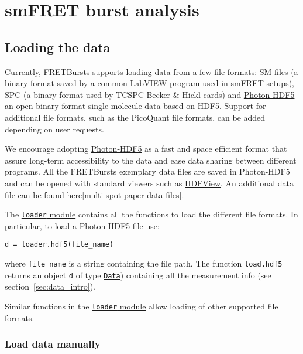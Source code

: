 \section{smFRET burst analysis}
\label{sec:analysis}

\subsection{Loading the data}
\label{sec:dataload}

Currently, FRETBursts supports loading data from a few file formats: SM files
(a binary format saved by a common LabVIEW program used in smFRET setups), 
SPC (a binary format used by TCSPC Becker \& Hickl cards) and 
\href{http://photon-hdf5.readthedocs.org/}{Photon-HDF5}  an open binary 
format single-molecule data based on HDF5. Support for additional file formats,
such as the PicoQuant file formats, can be added depending on user requests.

We encourage adopting \href{http://photon-hdf5.readthedocs.org/}{Photon-HDF5}
as a fast and space efficient format that assure long-term accessibility 
to the data and ease data sharing between different programs. All the 
FRETBursts exemplary data files are saved in Photon-HDF5 and can be opened with 
standard viewers such as 
\href{http://www.hdfgroup.org/products/java/hdfview/}{HDFView}. An additional data file 
can be found here[multi-spot paper data files].

The \href{http://fretbursts.readthedocs.org/en/latest/loader.html}{\texttt{loader} module}
contains all the functions to load the different file formats. 
In particular, to load a Photon-HDF5 file use:

\begin{verbatim}
d = loader.hdf5(file_name)
\end{verbatim}

where \verb|file_name| is a string containing the file path. The function
\verb|load.hdf5| returns an object \verb|d| of type 
\href{http://fretbursts.readthedocs.org/en/latest/data_class.html}{\texttt{Data}}) 
containing all the measurement info (see section~\ref{sec:data_intro}).

Similar functions in the 
\href{http://fretbursts.readthedocs.org/en/latest/loader.html}{\texttt{loader} module} 
allow loading of other supported file formats.

\subsubsection{Load data manually}

